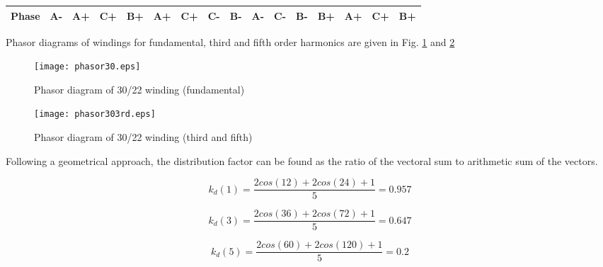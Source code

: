 \documentclass{reportClass}
\begin{document}
\begin{table}[h!]
\begin{tabular}{|clllllllllllllll|}
\multicolumn{1}{|c|}{\textbf{Phase}}   & \multicolumn{1}{l|}{\cellcolor[HTML]{FCFF2F}\textbf{A-}} & \multicolumn{1}{l|}{\cellcolor[HTML]{FCFF2F}\textbf{A+}} & \multicolumn{1}{l|}{\cellcolor[HTML]{CBCEFB}\textbf{C+}} & \multicolumn{1}{l|}{\cellcolor[HTML]{90E3FB}\textbf{B+}} & \multicolumn{1}{l|}{\cellcolor[HTML]{FCFF2F}\textbf{A+}} & \multicolumn{1}{l|}{\cellcolor[HTML]{CBCEFB}\textbf{C+}} & \multicolumn{1}{l|}{\cellcolor[HTML]{CBCEFB}\textbf{C-}} & \multicolumn{1}{l|}{\cellcolor[HTML]{90E3FB}\textbf{B-}} & \multicolumn{1}{l|}{\cellcolor[HTML]{FCFF2F}\textbf{A-}} & \multicolumn{1}{l|}{\cellcolor[HTML]{CBCEFB}\textbf{C-}} & \multicolumn{1}{l|}{\cellcolor[HTML]{90E3FB}\textbf{B-}} & \multicolumn{1}{l|}{\cellcolor[HTML]{90E3FB}\textbf{B+}} & \multicolumn{1}{l|}{\cellcolor[HTML]{FCFF2F}\textbf{A+}} & \multicolumn{1}{l|}{\cellcolor[HTML]{CBCEFB}\textbf{C+}} & \cellcolor[HTML]{90E3FB}\textbf{B+} \\ \hline
\end{tabular}
\end{table}

Phasor diagrams of windings for fundamental, third and fifth order harmonics are given in Fig. \ref{fig:phas30} and \ref{fig:phas303} 

\begin{figure}[h!]
    \centering
    \texttt{[image: phasor30.eps]}
    \caption{Phasor diagram of 30/22 winding (fundamental)}
    \label{fig:phas30}
\end{figure}

\begin{figure}[h!]
    \centering
    \texttt{[image: phasor303rd.eps]}

    \caption{Phasor diagram of 30/22 winding (third and fifth)}
    \label{fig:phas303}
\end{figure}

Following a geometrical approach, the distribution factor can be found as the ratio of the vectoral sum to arithmetic sum of the vectors.

\begin{equation*}
    k_d(1) = \dfrac{2cos(12)+2cos(24)+1}{5} = 0.957
\end{equation*}

\begin{equation*}
    k_d(3) = \dfrac{2cos(36)+2cos(72)+1}{5} = 0.647
\end{equation*}

\begin{equation*}
    k_d(5) = \dfrac{2cos(60)+2cos(120)+1}{5} = 0.2
\end{equation*}
\end{document}
